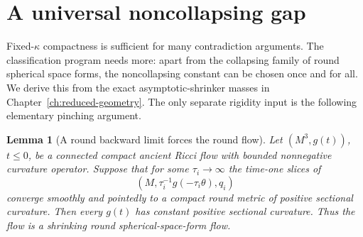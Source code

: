 \documentclass[10pt]{coll-l}
\newtheorem{lemma}[theorem]{Lemma}
\theoremstyle{definition}
\theoremstyle{remark}
\numberwithin{section}{chapter}
\numberwithin{equation}{chapter}
\begin{document}
\section{A universal noncollapsing gap}
\label{sec:ksol-universal-gap}

Fixed-$\kappa$ compactness is sufficient for many contradiction arguments.
The classification program needs more: apart from the collapsing family of
round spherical space forms, the noncollapsing constant can be chosen once
and for all.  We derive this from the exact asymptotic-shrinker masses in
Chapter~\ref{ch:reduced-geometry}.  The only separate rigidity input is the
following elementary pinching argument.

\begin{lemma}[A round backward limit forces the round flow]
\label{lem:ksol-round-backward-rigidity}
Let $(M^3,g(t))$, $t\leq0$, be a connected compact ancient Ricci flow with
bounded nonnegative curvature operator.  Suppose that for some
$\tau_i\to\infty$ the time-one slices of
\[
        (M,\tau_i^{-1}g(-\tau_i\theta),q_i)
\]
converge smoothly and pointedly to a compact round metric of positive
sectional curvature.  Then every $g(t)$ has constant positive sectional
curvature.  Thus the flow is a shrinking round spherical-space-form flow.
\end{lemma}
\end{document}
